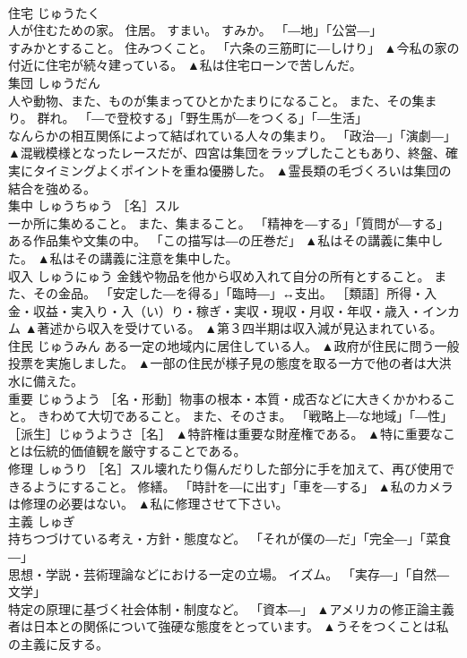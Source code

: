 \documentclass[8pt]{extreport}
\begin{document}
\begin{CJK}{UTF8}{min}
\\	住宅	じゅうたく	
\\	人が住むための家。 住居。 すまい。 すみか。 「―地」「公営―」 
\\	すみかとすること。 住みつくこと。 「六条の三筋町に―しけり」	▲今私の家の付近に住宅が続々建っている。 ▲私は住宅ローンで苦しんだ。
\\	集団	しゅうだん	
\\	人や動物、また、ものが集まってひとかたまりになること。 また、その集まり。 群れ。 「―で登校する」「野生馬が―をつくる」「―生活」 
\\	なんらかの相互関係によって結ばれている人々の集まり。 「政治―」「演劇―」	▲混戦模様となったレースだが、四宮は集団をラップしたこともあり、終盤、確実にタイミングよくポイントを重ね優勝した。 ▲霊長類の毛づくろいは集団の結合を強める。
\\	集中	しゅうちゅう	［名］スル 
\\	一か所に集めること。 また、集まること。 「精神を―する」「質問が―する」 
\\	ある作品集や文集の中。 「この描写は―の圧巻だ」	▲私はその講義に集中した。 ▲私はその講義に注意を集中した。
\\	収入	しゅうにゅう	金銭や物品を他から収め入れて自分の所有とすること。 また、その金品。 「安定した―を得る」「臨時―」↔支出。 ［類語］所得・入金・収益・実入り・入（い）り・稼ぎ・実収・現収・月収・年収・歳入・インカム	▲著述から収入を受けている。 ▲第３四半期は収入減が見込まれている。
\\	住民	じゅうみん	ある一定の地域内に居住している人。	▲政府が住民に問う一般投票を実施しました。 ▲一部の住民が様子見の態度を取る一方で他の者は大洪水に備えた。
\\	重要	じゅうよう	［名・形動］物事の根本・本質・成否などに大きくかかわること。 きわめて大切であること。 また、そのさま。 「戦略上―な地域」「―性」 ［派生］じゅうようさ［名］	▲特許権は重要な財産権である。 ▲特に重要なことは伝統的価値観を厳守することである。
\\	修理	しゅうり	［名］スル壊れたり傷んだりした部分に手を加えて、再び使用できるようにすること。 修繕。 「時計を―に出す」「車を―する」	▲私のカメラは修理の必要はない。 ▲私に修理させて下さい。
\\	主義	しゅぎ	
\\	持ちつづけている考え・方針・態度など。 「それが僕の―だ」「完全―」「菜食―」 
\\	思想・学説・芸術理論などにおける一定の立場。 イズム。 「実存―」「自然―文学」 
\\	特定の原理に基づく社会体制・制度など。 「資本―」	▲アメリカの修正論主義者は日本との関係について強硬な態度をとっています。 ▲うそをつくことは私の主義に反する。

\end{CJK}
\end{document}
